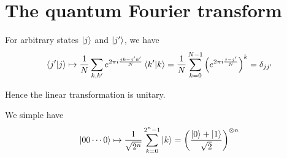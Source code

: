 \documentclass[../main.tex]{subfiles}
\begin{document}
\setcounter{chapter}{5}
\section{The quantum Fourier transform}

\begin{exercise}
\end{exercise}
For arbitrary states $\ket{j}$ and $\ket{j^\prime}$, we have
\[
    \braket{j^\prime\vert j}\mapsto\frac{1}{N}\sum_{k,k^\prime}e^{2\pi i\frac{j k-j^\prime k^\prime}{N}}\braket{k^\prime\vert k}=\frac{1}{N}\sum_{k=0}^{N-1}\left(e^{2\pi i\frac{j-j^\prime}{N}}\right)^k=\delta_{j j^\prime}
\]

Hence the linear transformation is unitary.

\bigskip
\begin{exercise}
\end{exercise}
We simple have
\[
    \ket{00\cdots0}\mapsto\frac{1}{\sqrt{2^n}}\sum_{k=0}^{2^n-1}\ket{k}=\left(\frac{\ket{0}+\ket{1}}{\sqrt{2}}\right)^{\otimes n}
\]
\end{document}
